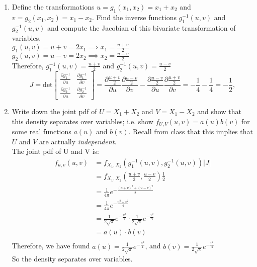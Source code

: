 \documentclass[11pt]{article}
\begin{document}
\begin{enumerate}[label=\textbf{Question \arabic*:},start=1]
\begin{enumerate}
  \item Define the transformations $u = g_1(x_1,x_2) = x_1 + x_2$ and $v = g_2(x_1,x_2) = x_1 - x_2$. Find the inverse functions $g_1^{-1}(u,v)$ and $g_2^{-1}(u,v)$ and compute the Jacobian of this bivariate transformation of variables.\\
  
  $g_1(u, v) = u + v = 2 x_1 \implies x_1 = \frac{u+v}{2} $\\
  $g_2(u, v) = u - v = 2 x_2 \implies x_2 = \frac{u-v}{2} $\\
  
  Therefore, $g_1^{-1}(u,v) =\frac{u+v}{2} $ and $g_2^{-1}(u,v) = \frac{u-v}{2}$\\
  
  \[
J = \text{det}
\begin{bmatrix}
	\frac {\partial g_1^{-1}}{\partial u}	& \frac {\partial g_1^{-1}}{\partial v} \\
	\frac {\partial g_2^{-1}}{\partial u}	& \frac {\partial g_2^{-1}}{\partial v}
\end{bmatrix}
= \frac {\partial \frac{u+v}{2}}{\partial u} \frac {\partial \frac{u-v}{2}}{\partial v} - \frac {\partial \frac{u-v}{2}}{\partial u} \frac {\partial \frac{u+v}{2}}{\partial v} = -\frac{1}{4} -\frac{1}{4} = -\frac{1}{2},
\]

  \item Write down the joint pdf of $U = X_1 + X_2$ and $V = X_1 - X_2$ and show that this density separates over variables; i.e. show $f_{U,V}(u,v) = a(u)b(v)$ for some real functions $a(u)$ and $b(v)$. Recall from class that this implies that $U$ and $V$ are actually {\em independent}. \\
  
  The joint pdf of U and V is:\\
  \begin{align*}
  f_{u,v}(u,v) & = f_{X_1,X_2}\left( g_1^{-1}(u,v), g_2^{-1}(u,v)\right) |J| \\
   & = f_{X_1,X_2}\left( \frac{u+v}{2}, \frac{u-v}{2}\right) \frac{1}{2} \\
   & = \frac{1}{4 \pi} e^{-\frac{(u+v)^2 + (u-v)^2}{8}} \\
   & = \frac{1}{4 \pi} e^{-\frac{u^2 + v^2}{4}} \\
   & = \frac{1}{2\sqrt{\pi}} e^{-\frac{u^2}{4}} \cdot \frac{1}{2\sqrt{\pi}} e^{-\frac{v^2}{4}} \\
   & = a(u) \cdot b(v) \\
  \end{align*}
  Therefore, we have found $a(u) = \frac{1}{2\sqrt{\pi}} e^{-\frac{u^2}{4}} $, and $b(v) = \frac{1}{2\sqrt{\pi}} e^{-\frac{v^2}{4}} $\\
  So the density separates over variables.\\
 


\end{enumerate}
\end{enumerate}
\end{document}
